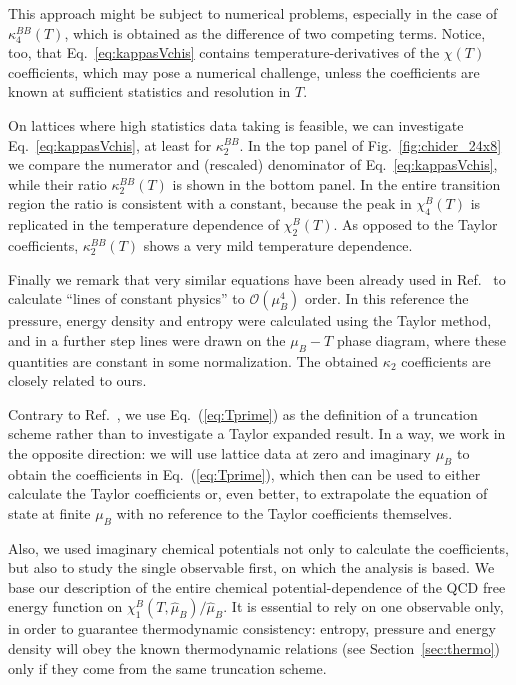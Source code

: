 \documentclass[aps,prd,twocolumn,superscriptaddress]{revtex4-2}
\newcommand \hmu {\hat{\mu}}
\begin{document}
This approach might be subject to numerical problems, especially in
the case of $\kappa_4^{BB}(T)$, which is obtained as the difference of two competing
terms. Notice, too, that Eq.~\eqref{eq:kappasVchis} contains temperature-derivatives 
of the $\chi(T)$ coefficients, which may pose a numerical
challenge, unless the coefficients are known at sufficient statistics and
resolution in $T$.

On lattices where high statistics data taking is feasible, we can investigate
Eq.~\eqref{eq:kappasVchis}, at least for $\kappa_2^{BB}$. In the top panel of
Fig.~\ref{fig:chider_24x8} we compare the numerator and (rescaled)
denominator of Eq.~\eqref{eq:kappasVchis}, while their ratio $\kappa_2^{BB}(T)$ 
is shown in the bottom panel. In the entire transition region
the ratio is consistent with a constant, because the peak in $\chi^B_4(T)$ is
replicated in the temperature dependence of $\chi^B_2(T)$. As opposed to
the Taylor coefficients, $\kappa_2^{BB}(T)$ shows a very mild temperature dependence.

Finally we remark that very similar equations have been already used 
in Ref.~\cite{Bazavov:2017dus} to calculate ``lines of constant physics''
to $\mathcal{O}(\mu_B^4)$ order. In this reference the
pressure, energy density and entropy were calculated using the Taylor
method, and in a further step lines were drawn on the $\mu_B-T$ 
phase diagram, where these quantities are constant in some normalization.
The obtained $\kappa_2$ coefficients are closely related to ours. 

Contrary to Ref.~\cite{Bazavov:2017dus}, we use Eq.~(\ref{eq:Tprime}) as the
definition of a truncation scheme rather than to investigate a Taylor expanded
result. In a way, we work in the opposite direction: we will use lattice
data at zero and imaginary $\mu_B$ to obtain the coefficients in 
Eq.~(\ref{eq:Tprime}), which then can be used to either calculate the 
Taylor coefficients or, even better, to extrapolate the equation of state
at finite $\mu_B$ with no reference to the Taylor coefficients themselves.

Also, we used imaginary chemical potentials not only to calculate the
coefficients, but also to study the single observable first, on
which the analysis is based. 
We base our description of the entire chemical potential-dependence of 
the QCD free energy function on $\chi_1^B(T,\hmu_B)/\hmu_B$. It is essential
to rely on one observable only, in order to guarantee thermodynamic consistency: 
entropy, pressure and energy density will obey the known thermodynamic relations 
(see Section~\ref{sec:thermo}) only if they come from the same truncation scheme.
\end{document}
